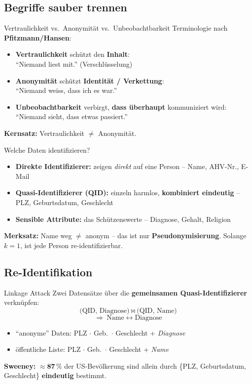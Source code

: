\documentclass[a4paper, fontsize=7pt]{scrartcl}
\begin{document}
\subsection{Begriffe sauber trennen}

\begin{mainbox}{Vertraulichkeit vs.\ Anonymität vs.\ Unbeobachtbarkeit}
Terminologie nach \textbf{Pfitzmann/Hansen}:
\begin{itemize}
    \item \textbf{Vertraulichkeit} schützt den \textbf{Inhalt}:\\
          ``Niemand liest mit.'' (Verschlüsselung)
    \item \textbf{Anonymität} schützt \textbf{Identität / Verkettung}:\\
          ``Niemand weiss, dass ich es war.''
    \item \textbf{Unbeobachtbarkeit} verbirgt, \textbf{dass überhaupt}
          kommuniziert wird:\\
          ``Niemand sieht, dass etwas passiert.''
\end{itemize}
\textbf{Kernsatz:} Vertraulichkeit $\neq$ Anonymität.
\end{mainbox}

\begin{mainbox}{Welche Daten identifizieren?}
\begin{itemize}
    \item \textbf{Direkte Identifizierer:} zeigen \emph{direkt} auf eine
          Person -- Name, AHV-Nr., E-Mail
    \item \textbf{Quasi-Identifizierer (QID):} einzeln harmlos,
          \textbf{kombiniert eindeutig} -- PLZ, Geburtsdatum, Geschlecht
    \item \textbf{Sensible Attribute:} das Schützenswerte -- Diagnose,
          Gehalt, Religion
\end{itemize}
\textbf{Merksatz:} Name weg \textbf{$\neq$} anonym -- das ist nur
\textbf{Pseudonymisierung}. Solange $k = 1$, ist jede Person
re-identifizierbar.
\end{mainbox}

\subsection{Re-Identifikation}

\begin{mainbox}{Linkage Attack}
Zwei Datensätze über die \textbf{gemeinsamen Quasi-Identifizierer}
verknüpfen:
$$\text{(QID, Diagnose)} \ \bowtie\ \text{(QID, Name)}$$
$$\Rightarrow\ \text{Name} \leftrightarrow \text{Diagnose}$$
\begin{itemize}
    \item ``anonyme'' Daten: PLZ $\cdot$ Geb.\ $\cdot$ Geschlecht
          + \emph{Diagnose}
    \item öffentliche Liste: PLZ $\cdot$ Geb.\ $\cdot$ Geschlecht
          + \emph{Name}
\end{itemize}
\textbf{Sweeney:} $\approx \mathbf{87\,\%}$ der US-Bevölkerung sind allein
durch \{PLZ, Geburtsdatum, Geschlecht\} \textbf{eindeutig} bestimmt.
\end{mainbox}
\end{document}
